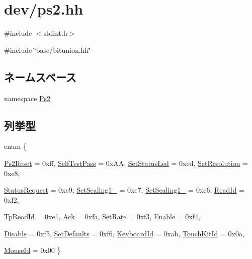 \hypertarget{ps2_8hh}{
\section{dev/ps2.hh}
\label{ps2_8hh}
}
{\ttfamily \#include $<$stdint.h$>$}\par
{\ttfamily \#include \char`\"{}base/bitunion.hh\char`\"{}}\par
\subsection*{ネームスペース}
\begin{DoxyCompactItemize}
\item 
namespace \hyperlink{namespacePs2}{Ps2}
\end{DoxyCompactItemize}
\subsection*{列挙型}
\begin{DoxyCompactItemize}
\item 
enum \{ \par
\hyperlink{namespacePs2_ade9ca5088d171ad20b4c237f1c2d6260ab94340921dab0f119f136535b864513d}{Ps2Reset} =  0xff, 
\hyperlink{namespacePs2_ade9ca5088d171ad20b4c237f1c2d6260a14fc2df74316f5dd4e6f966fc51e957b}{SelfTestPass} =  0xAA, 
\hyperlink{namespacePs2_ade9ca5088d171ad20b4c237f1c2d6260a36f87d1c0c43c191f93d6de93b61c680}{SetStatusLed} =  0xed, 
\hyperlink{namespacePs2_ade9ca5088d171ad20b4c237f1c2d6260a1fa45c553056ac473f7d280e9f8b58e6}{SetResolution} =  0xe8, 
\par
\hyperlink{namespacePs2_ade9ca5088d171ad20b4c237f1c2d6260a9ba7da7cb05b70c6e69554c900798422}{StatusRequest} =  0xe9, 
\hyperlink{namespacePs2_ade9ca5088d171ad20b4c237f1c2d6260a169a1edb5a033b89d4fde46312a4a42e}{SetScaling1\_} =  0xe7, 
\hyperlink{namespacePs2_ade9ca5088d171ad20b4c237f1c2d6260ac4f02365c2c47cd955cdefd85b13cc5a}{SetScaling1\_} =  0xe6, 
\hyperlink{namespacePs2_ade9ca5088d171ad20b4c237f1c2d6260a8dedaaa85915ce30519ec1bed06c596f}{ReadId} =  0xf2, 
\par
\hyperlink{namespacePs2_ade9ca5088d171ad20b4c237f1c2d6260a527ad085e213273c22332f72e8cdf2c1}{TpReadId} =  0xe1, 
\hyperlink{namespacePs2_ade9ca5088d171ad20b4c237f1c2d6260a4d1dd807aba01d482342c0e103048b04}{Ack} =  0xfa, 
\hyperlink{namespacePs2_ade9ca5088d171ad20b4c237f1c2d6260aa2f456f6ee31b989e5858505c68c2c63}{SetRate} =  0xf3, 
\hyperlink{namespacePs2_ade9ca5088d171ad20b4c237f1c2d6260a80cb2080e90221d1f5b425387d9bd030}{Enable} =  0xf4, 
\par
\hyperlink{namespacePs2_ade9ca5088d171ad20b4c237f1c2d6260a9f306dd8981a103d6827f8b4e80da8aa}{Disable} =  0xf5, 
\hyperlink{namespacePs2_ade9ca5088d171ad20b4c237f1c2d6260a4ed94c0e613225a111a286b0479c5ced}{SetDefaults} =  0xf6, 
\hyperlink{namespacePs2_ade9ca5088d171ad20b4c237f1c2d6260a08d0dcb008b3033a86ab91e16e22c137}{KeyboardId} =  0xab, 
\hyperlink{namespacePs2_ade9ca5088d171ad20b4c237f1c2d6260a83431181d5117c65b1ee2d74705f3a24}{TouchKitId} =  0x0a, 
\par
\hyperlink{namespacePs2_ade9ca5088d171ad20b4c237f1c2d6260af70bb8bb050931a09933b9988efde622}{MouseId} =  0x00
 \}
\end{DoxyCompactItemize}
